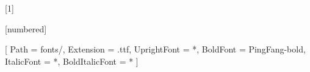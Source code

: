 
\RequirePackage{wrapfig}
\RequirePackage{pgfplots}
\RequirePackage{graphicx}
\RequirePackage{adjustbox}
\RequirePackage{environ}
\pgfplotsset{compat=1.18}

\makeatletter
\newsavebox{\measure@tikzpicture}
[1]{%
  \def\tikz@width{#1}%
  \def\tikzscale{1}\begin{lrbox}{\measure@tikzpicture}%
  \BODY
  \end{lrbox}%
  \edef\tikzscale{\pgfmathresult}%
  \BODY
}
\makeatother

\RequirePackage{textcomp}
\RequirePackage{amsmath}
\RequirePackage{amsthm}
\RequirePackage{mathtools}
\DeclareMathOperator*{\argmax}{arg\,max}
\DeclareMathOperator*{\argmin}{arg\,min}

[numbered] %

\theoremstyle{definition}
\newtheorem{fact}{Fact}[section]
\newtheorem{examp}{Example}[section]

\theoremstyle{plain}
\newtheorem{definition}{Definition}[section]
\newtheorem{proposition}{Proposition}
\newtheorem{theorem}{Theorem}
\newtheorem{assumption}{Assumption}

\providecommand{\H}{\mathscr{H}}
\providecommand{\E}{\mathbb{E}}
\makeatletter
\def\munderbar#1{\underline{\sbox\tw@{$#1$}\dp\tw@\z@\box\tw@}}
\makeatother
\usepackage{fontspec}
\usepackage{xeCJK}
\usepackage{calligra}
\usepackage{tabularx}
\usepackage{colortbl}

[
    Path = fonts/,
    Extension = .ttf,
    UprightFont = *,
    BoldFont = PingFang-bold,
    ItalicFont = *,
    BoldItalicFont = *
]


